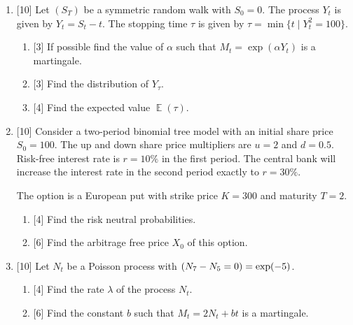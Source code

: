 \documentclass[12pt]{article}
\let\P\relax
\DeclareMathOperator{\P}{\mathbb{P}}
\DeclareMathOperator{\E}{\mathbb{E}}
\begin{document}
\begin{enumerate}
 
    \item {[10]} Let $(S_T)$ be a symmetric random walk with $S_0 = 0$.
    The process $Y_t$ is given by $Y_t = S_t - t$. 
    The stopping time $\tau$ is given by $\tau=\min\{t \mid Y_t^2=100\}$. 

    \begin{enumerate}
        \item {[3]} If possible find the value of $\alpha$ such that $M_t = \exp(\alpha Y_t)$ is a martingale.
        \item {[3]} Find the distribution of $Y_{\tau}$.
        \item {[4]} Find the expected value $\E(\tau)$.
    \end{enumerate}
     

    \item {[10]} Consider a two-period binomial tree model with an initial share price $S_0 = 100$. 
    The up and down share price multipliers are $u = 2$ and $d = 0.5$. 
    Risk-free interest rate is $r = 10\%$ in the first period. 
    The central bank will increase the interest rate in the second period exactly to $r = 30\%$.

    The option is a European put with strike price $K = 300$ and maturity $T = 2$. 
    
    \begin{enumerate}
        \item {[4]} Find the risk neutral probabilities.
        \item {[6]} Find the arbitrage free price $X_0$ of this option.
    \end{enumerate}

    \item {[10]} Let $N_t$ be a Poisson process with $\P(N_7 - N_5 = 0) = \exp(-5)$.
    \begin{enumerate}
      \item {[4]} Find the rate $\lambda$ of the process $N_t$. 
      \item {[6]} Find the constant $b$ such that $M_t = 2N_t + bt$ is a martingale.
    \end{enumerate}


\end{enumerate}
\end{document}
